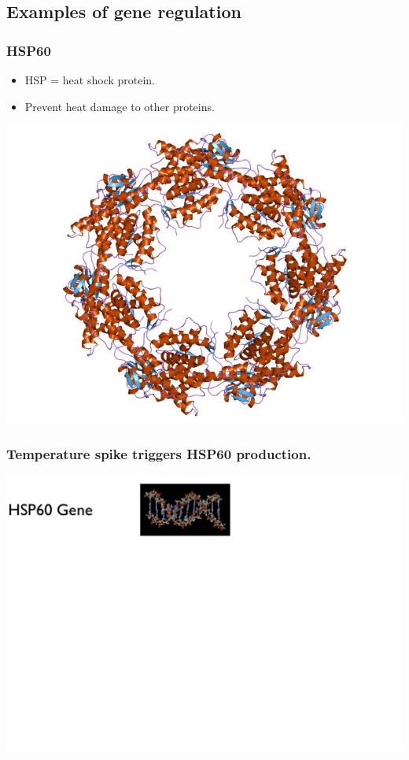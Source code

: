 \documentclass[handout]{beamer}
\numberwithin{equation}{section}
\begin{document}
\subsection{Examples of gene regulation}

\begin{frame}
\frametitle{HSP60}

\begin{itemize}
\item HSP = heat shock protein. 
\item Prevent heat damage to other proteins.
\end{itemize}
\begin{center}
\includegraphics[scale=.23]{fig/hsp60.jpg}
\end{center}
\end{frame}

\begin{frame}
\frametitle{Temperature spike triggers HSP60 production.}
\begin{center}
\includegraphics[scale=.25]{fig/hspt1.png}
\end{center}
\end{frame}
\end{document}
